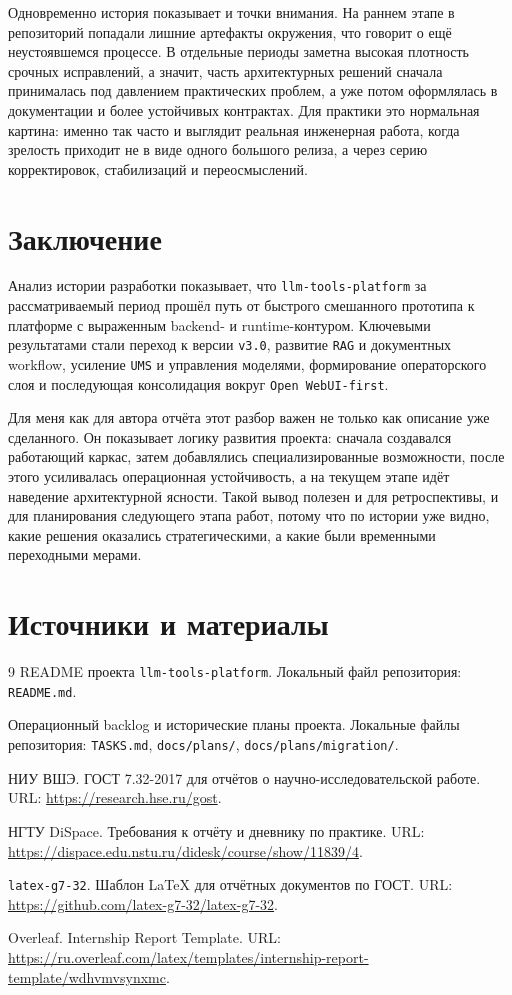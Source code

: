 \documentclass[12pt,a4paper]{article}
\begin{document}
Одновременно история показывает и точки внимания. На раннем этапе в репозиторий попадали лишние артефакты окружения, что говорит о ещё неустоявшемся процессе. В отдельные периоды заметна высокая плотность срочных исправлений, а значит, часть архитектурных решений сначала принималась под давлением практических проблем, а уже потом оформлялась в документации и более устойчивых контрактах. Для практики это нормальная картина: именно так часто и выглядит реальная инженерная работа, когда зрелость приходит не в виде одного большого релиза, а через серию корректировок, стабилизаций и переосмыслений.

\section{Заключение}

Анализ истории разработки показывает, что \texttt{llm-tools-platform} за рассматриваемый период прошёл путь от быстрого смешанного прототипа к платформе с выраженным backend- и runtime-контуром. Ключевыми результатами стали переход к версии \texttt{v3.0}, развитие \texttt{RAG} и документных workflow, усиление \texttt{UMS} и управления моделями, формирование операторского слоя и последующая консолидация вокруг \texttt{Open WebUI-first}.

Для меня как для автора отчёта этот разбор важен не только как описание уже сделанного. Он показывает логику развития проекта: сначала создавался работающий каркас, затем добавлялись специализированные возможности, после этого усиливалась операционная устойчивость, а на текущем этапе идёт наведение архитектурной ясности. Такой вывод полезен и для ретроспективы, и для планирования следующего этапа работ, потому что по истории уже видно, какие решения оказались стратегическими, а какие были временными переходными мерами.

\section*{Источники и материалы}

\begin{thebibliography}{9}
README проекта \texttt{llm-tools-platform}. Локальный файл репозитория: \texttt{README.md}.

Операционный backlog и исторические планы проекта. Локальные файлы репозитория: \texttt{TASKS.md}, \texttt{docs/plans/}, \texttt{docs/plans/migration/}.

НИУ ВШЭ. ГОСТ 7.32-2017 для отчётов о научно-исследовательской работе. URL: \url{https://research.hse.ru/gost}.

НГТУ DiSpace. Требования к отчёту и дневнику по практике. URL: \url{https://dispace.edu.nstu.ru/didesk/course/show/11839/4}.

\texttt{latex-g7-32}. Шаблон \LaTeX{} для отчётных документов по ГОСТ. URL: \url{https://github.com/latex-g7-32/latex-g7-32}.

Overleaf. Internship Report Template. URL: \url{https://ru.overleaf.com/latex/templates/internship-report-template/wdhvmvsynxmc}.
\end{thebibliography}
\end{document}
